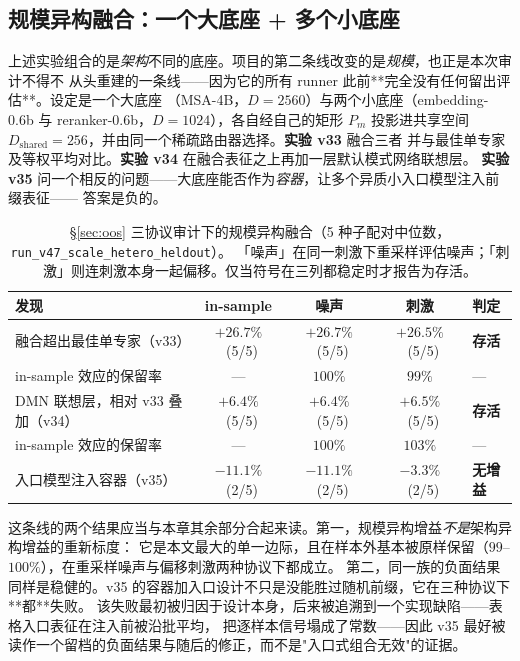 \documentclass[10pt,twoside]{article}
\theoremstyle{definition}
\theoremstyle{plain}
\theoremstyle{remark}
\begin{document}
\subsection{规模异构融合：一个大底座 + 多个小底座}
\label{sec:scale-hetero-exp}

上述实验组合的是\emph{架构}不同的底座。项目的第二条线改变的是\emph{规模}，也正是本次审计不得不
从头重建的一条线——因为它的所有 runner 此前**完全没有任何留出评估**。设定是一个大底座
（MSA-4B，$D=2560$）与两个小底座（embedding-0.6b 与 reranker-0.6b，$D=1024$），各自经自己的矩形
$P_m$ 投影进共享空间 $D_{\text{shared}}{=}256$，并由同一个稀疏路由器选择。\textbf{实验 v33} 融合三者
并与最佳单专家及等权平均对比。\textbf{实验 v34} 在融合表征之上再加一层默认模式网络联想层。
\textbf{实验 v35} 问一个相反的问题——大底座能否作为\emph{容器}，让多个异质小入口模型注入前缀表征——
答案是负的。

\begin{table}[htbp]
\centering
\caption{\S\ref{sec:oos} 三协议审计下的规模异构融合（5 种子配对中位数，\texttt{run\_v47\_scale\_hetero\_heldout}）。
「噪声」在同一刺激下重采样评估噪声；「刺激」则连刺激本身一起偏移。仅当符号在三列都稳定时才报告为存活。}
\label{tab:scale-hetero}
\small
\setlength{\tabcolsep}{4.5pt}
\begin{tabular}{p{}ccc p{}}
\toprule
\textbf{发现} & \textbf{in-sample} & \textbf{噪声} & \textbf{刺激} & \textbf{判定} \\
\midrule
融合超出最佳单专家（v33） & $+26.7\%$ \ (5/5) & $+26.7\%$ \ (5/5) & $+26.5\%$ \ (5/5) & \textbf{存活} \\
\quad\quad in-sample 效应的保留率 & --- & $100\%$ & $99\%$ & --- \\
DMN 联想层，相对 v33 叠加（v34） & $+6.4\%$ \ (5/5) & $+6.4\%$ \ (5/5) & $+6.5\%$ \ (5/5) & \textbf{存活} \\
\quad\quad in-sample 效应的保留率 & --- & $100\%$ & $103\%$ & --- \\
入口模型注入容器（v35） & $-11.1\%$ \ (2/5) & $-11.1\%$ \ (2/5) & $-3.3\%$ \ (2/5) & \textbf{无增益} \\
\bottomrule
\end{tabular}
\end{table}

这条线的两个结果应当与本章其余部分合起来读。第一，规模异构增益\emph{不是}架构异构增益的重新标度：
它是本文最大的单一边际，且在样本外基本被原样保留（$99$--$100\%$），在重采样噪声与偏移刺激两种协议下都成立。
第二，同一族的负面结果同样是稳健的。v35 的容器加入口设计不只是没能胜过随机前缀，它在三种协议下**都**失败。
该失败最初被归因于设计本身，后来被追溯到一个实现缺陷——表格入口表征在注入前被沿批平均，
把逐样本信号塌成了常数——因此 v35 最好被读作一个留档的负面结果与随后的修正，而不是"入口式组合无效"的证据。
\end{document}
